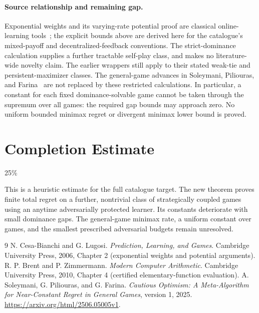 \documentclass[11pt]{article}
\theoremstyle{definition}
\theoremstyle{remark}
\begin{document}
\paragraph{Source relationship and remaining gap.}
Exponential weights and its varying-rate potential proof are classical
online-learning tools~\cite{CBL}; the explicit bounds above are derived here
for the catalogue's mixed-payoff and decentralized-feedback conventions.
The strict-dominance calculation supplies a further tractable self-play
class, and makes no literature-wide novelty claim. The earlier wrappers
still apply to their stated weak-tie and persistent-maximizer classes.
The general-game advances in Soleymani, Piliouras, and Farina~\cite{source}
are not replaced by these restricted calculations. In particular, a
constant for each fixed dominance-solvable game cannot be taken through the
supremum over all games: the required gap bounds may approach zero. No
uniform bounded minimax regret or divergent minimax lower bound is proved.

\section{Completion Estimate}
25\%

This is a heuristic estimate for the full catalogue target.
The new theorem proves finite total regret on a further, nontrivial class
of strategically coupled games using an anytime adversarially protected learner.
Its constants deteriorate with small dominance gaps. The general-game
minimax rate, a uniform constant over games, and the smallest prescribed
adversarial budgets remain unresolved.

\begin{thebibliography}{9}
 N. Cesa-Bianchi and G. Lugosi.
\emph{Prediction, Learning, and Games}. Cambridge University Press, 2006,
Chapter 2 (exponential weights and potential arguments).
 R. P. Brent and P. Zimmermann.
\emph{Modern Computer Arithmetic}. Cambridge University Press, 2010,
Chapter 4 (certified elementary-function evaluation).
 A. Soleymani, G. Piliouras, and G. Farina.
\emph{Cautious Optimism: A Meta-Algorithm for Near-Constant Regret in General Games}, version 1, 2025.
\url{https://arxiv.org/html/2506.05005v1}.
\end{thebibliography}
\end{document}

